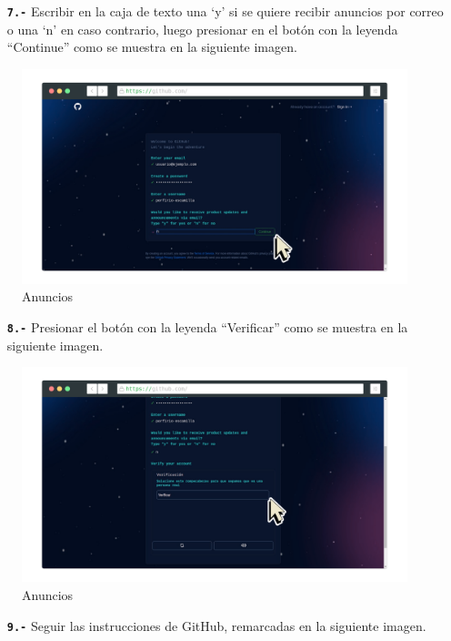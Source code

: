 \begin{itemize}
    \item[\textbf{\texttt{7.-}}] Escribir en la caja de texto una `y' si se quiere recibir anuncios por correo o una `n' en caso contrario, luego presionar en el botón con la leyenda ``Continue'' como se muestra en la siguiente imagen.
\end{itemize}
\begin{figure}[H]
    \centering
    \includegraphics[width=\paperwidth-12cm]{screenshot-rocks-GitHub-Anuncios-cursor.png}
    \caption{Anuncios}
\end{figure}
\begin{itemize}
    \item[\textbf{\texttt{8.-}}] Presionar el botón con la leyenda ``Verificar'' como se muestra en la siguiente imagen.
\end{itemize}
\begin{figure}[H]
    \centering
    \includegraphics[width=\paperwidth-12cm]{screenshot-rocks-GitHub-Verificacion-cursor.png}
    \caption{Anuncios}
\end{figure}
\begin{itemize}
    \item[\textbf{\texttt{9.-}}] Seguir las instrucciones de GitHub, remarcadas en la siguiente imagen.
\end{itemize}
